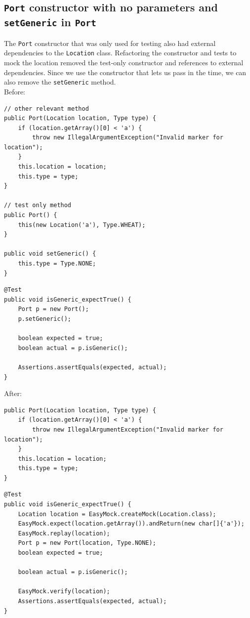 \documentclass{fank1basedocument}
\begin{document}
\subsection*{\texttt{Port} constructor with no parameters and \texttt{setGeneric} in \texttt{Port}}
The \texttt{Port} constructor that was only used for testing also had external dependencies to the \texttt{Location} class. Refactoring the constructor and tests to mock the location removed the test-only constructor and references to external dependencies. Since we use the constructor that lets us pass in the time, we can also remove the \texttt{setGeneric} method.\\

Before:
\begin{lstlisting}[style=javacode,language=myJava]
// other relevant method
public Port(Location location, Type type) {
	if (location.getArray()[0] < 'a') {
		throw new IllegalArgumentException("Invalid marker for location");
	}
	this.location = location;
	this.type = type;
}

// test only method
public Port() {
	this(new Location('a'), Type.WHEAT);
}

public void setGeneric() {
	this.type = Type.NONE;
}
\end{lstlisting}
\begin{lstlisting}[style=javacode,language=myJava]
@Test
public void isGeneric_expectTrue() {
	Port p = new Port();
	p.setGeneric();
	
	boolean expected = true;
	boolean actual = p.isGeneric();

	Assertions.assertEquals(expected, actual);
}
\end{lstlisting}
After:
\begin{lstlisting}[style=javacode,language=myJava]
public Port(Location location, Type type) {
	if (location.getArray()[0] < 'a') {
		throw new IllegalArgumentException("Invalid marker for location");
	}
	this.location = location;
	this.type = type;
}
\end{lstlisting}
\begin{lstlisting}[style=javacode,language=myJava]
@Test
public void isGeneric_expectTrue() {
	Location location = EasyMock.createMock(Location.class);
	EasyMock.expect(location.getArray()).andReturn(new char[]{'a'});
	EasyMock.replay(location);
	Port p = new Port(location, Type.NONE);
	boolean expected = true;

	boolean actual = p.isGeneric();

	EasyMock.verify(location);
	Assertions.assertEquals(expected, actual);
}
\end{lstlisting}
\end{document}
